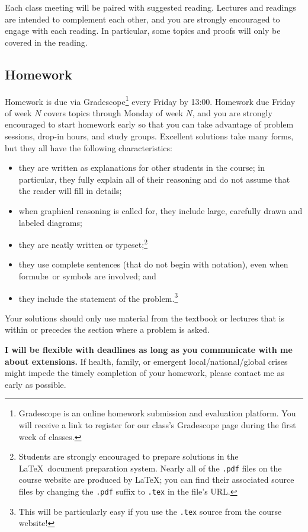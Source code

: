 \documentclass[11pt,twoside]{amsart}
\begin{document}
Each class meeting will be paired with suggested reading. Lectures and readings are intended to complement each other, and you are strongly encouraged to engage with each reading. In particular, some topics and proofs will only be covered in the reading.

\subsection*{Homework}
Homework is due via Gradescope\footnote{Gradescope is an online homework submission and evaluation platform. You will receive a link to register for our class's Gradescope page during the first week of classes.} every Friday by 13:00. Homework due Friday of week $N$ covers topics through Monday of week $N$, and you are strongly encouraged to start homework early so that you can take advantage of problem sessions, drop-in hours, and study groups.  Excellent solutions take many forms, but they all have the following characteristics:

\begin{itemize}
\item they are written as explanations for other students in the course; in particular, they fully explain all of their reasoning and do not assume that the reader will fill in details;
\item when graphical reasoning is called for, they include large, carefully drawn and labeled diagrams;
\item they are neatly written or typeset;\footnote{Students are strongly 
encouraged to prepare solutions in the \LaTeX~document preparation 
system.  Nearly all of the \texttt{.pdf} files on the course website are produced by \LaTeX; you can find their associated source files by changing the \texttt{.pdf} suffix to \texttt{.tex} in the file's URL.}
\item they use complete sentences (that do not begin with notation), even when formul\ae~or symbols are involved; and
\item they include the statement of the problem.\footnote{This will be particularly easy if you use the \texttt{.tex} source from the course website!}
\end{itemize}

Your solutions should only use material from the textbook or lectures that is within or precedes the section where a problem is asked.

\textbf{I will be flexible with deadlines as long as you communicate with me about extensions.} If health, family, or emergent local/national/global crises might impede the timely completion of your homework, please contact me as early as possible.
\end{document}
